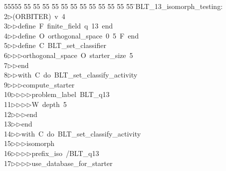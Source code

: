 %
%
\begin{tabbing}
55555 \= 55 \= 55 \= 55 \= 55 \= 55 \= 55 \= 55 \= 55 \= 55 \= 55 \= 55 \= 55 \= \>BLT\_13\_isomorph\_testing:\\[0pt]
2\>$\triangleright$\>(ORBITER)\ v\ 4\ \\[0pt]
3\>$\triangleright$\>$\triangleright$\>define\ F\ finite\_field\ q\ 13\ end\ \\[0pt]
4\>$\triangleright$\>$\triangleright$\>define\ O\ orthogonal\_space\ 0\ 5\ F\ end\ \\[0pt]
5\>$\triangleright$\>$\triangleright$\>define\ C\ BLT\_set\_classifier\ \\[0pt]
6\>$\triangleright$\>$\triangleright$\>$\triangleright$\>orthogonal\_space\ O\ starter\_size\ 5\ \\[0pt]
7\>$\triangleright$\>$\triangleright$\>end\ \\[0pt]
8\>$\triangleright$\>$\triangleright$\>with\ C\ do\ BLT\_set\_classify\_activity\ \\[0pt]
9\>$\triangleright$\>$\triangleright$\>$\triangleright$\>compute\_starter\ \\[0pt]
10\>$\triangleright$\>$\triangleright$\>$\triangleright$\>$\triangleright$\>problem\_label\ BLT\_q13\ \\[0pt]
11\>$\triangleright$\>$\triangleright$\>$\triangleright$\>$\triangleright$\>W\ depth\ 5\ \\[0pt]
12\>$\triangleright$\>$\triangleright$\>$\triangleright$\>end\ \\[0pt]
13\>$\triangleright$\>$\triangleright$\>end\ \\[0pt]
14\>$\triangleright$\>$\triangleright$\>with\ C\ do\ BLT\_set\_classify\_activity\ \\[0pt]
15\>$\triangleright$\>$\triangleright$\>$\triangleright$\>isomorph\ \\[0pt]
16\>$\triangleright$\>$\triangleright$\>$\triangleright$\>$\triangleright$\>prefix\_iso\ /BLT\_q13\ \\[0pt]
17\>$\triangleright$\>$\triangleright$\>$\triangleright$\>$\triangleright$\>use\_database\_for\_starter\ \\[0pt]

\end{tabbing}
